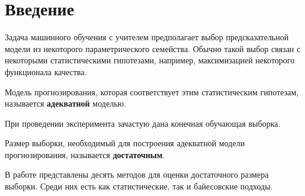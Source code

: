\section{Введение}

Задача машинного обучения с учителем предполагает выбор предсказательной модели из некоторого параметрического семейства. Обычно такой выбор связан с некоторыми статистическими гипотезами, например, максимизацией некоторого функционала качества. 
\begin{definition}
    Модель прогнозирования, которая соответствует этим статистическим гипотезам, называется \textbf{адекватной} моделью.
\end{definition}

При проведении эксперимента зачастую дана конечная обучающая выборка.

\begin{definition}
    Размер выборки, необходимый для построения адекватной модели прогнозирования, называется \textbf{достаточным}.
\end{definition}

В работе \cite{Grabovoy2022} представлены десять методов для оценки достаточного размера выборки. Среди них есть как статистические, так и байесовские подходы. 